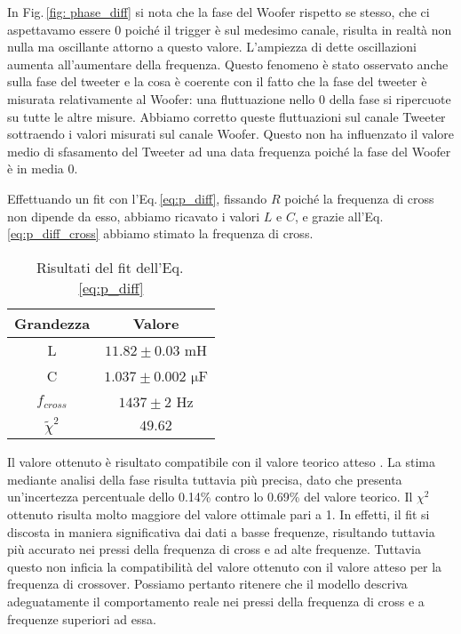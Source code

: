 \documentclass[../Relazione_circuiti]{subfiles}
\begin{document}
      In Fig.\,\ref{fig: phase_diff}
      si nota che la fase del Woofer rispetto se stesso, che ci aspettavamo essere 0 poiché il trigger è sul medesimo
      canale, risulta in realtà non nulla ma oscillante attorno a questo valore. L'ampiezza di dette oscillazioni
      aumenta all'aumentare della frequenza. Questo fenomeno è stato osservato anche sulla fase del tweeter e la cosa è
      coerente con il fatto che la fase del tweeter è misurata relativamente al Woofer: una fluttuazione nello 0 della
      fase si ripercuote su tutte le altre misure. Abbiamo corretto queste fluttuazioni sul canale Tweeter sottraendo i
      valori misurati sul canale Woofer. Questo non ha influenzato il valore medio di sfasamento del Tweeter ad una data
      frequenza poiché la fase del Woofer è in media 0.  
  
  
  Effettuando un fit con l'Eq.\,\eqref{eq:p_diff}, fissando $R$
      poiché la frequenza di cross non dipende da esso, abbiamo
      ricavato i valori $L$ e $C$, e grazie all'Eq.\,\eqref{eq:p_diff_cross} abbiamo stimato la frequenza di cross.



  \begin{table}[H]
    \centering

\begin{tabular}{c | c }
Grandezza & Valore  \\
\hline
L & $ 11.82 \pm 0.03 $  mH \\
C & $ 1.037 \pm 0.002 $  $\mathrm{\mu}$F \\
$f_{cross}$ & $ 1437 \pm 2$  Hz \\
$\widetilde{\chi}^2$ & $49.62$ 

    \end{tabular}
    \caption{Risultati del fit dell'Eq.\,\eqref{eq:p_diff}}
    \label{tab:fit_phase}

  \end{table}


Il valore ottenuto è risultato compatibile con il valore teorico atteso \theoryF. La stima mediante analisi della fase risulta tuttavia più precisa, dato che presenta un'incertezza percentuale dello 0.14\% contro lo 0.69\% del valore teorico. Il $\chi^2$ ottenuto risulta molto maggiore del valore ottimale pari a 1.
 In effetti, il fit si discosta in maniera significativa dai dati a basse frequenze, risultando tuttavia più accurato nei pressi della frequenza di cross e ad alte frequenze. Tuttavia questo non inficia la compatibilità del valore ottenuto con il valore atteso per la frequenza di crossover.
 Possiamo pertanto ritenere che il modello descriva adeguatamente il comportamento reale nei pressi della frequenza di cross e a frequenze superiori ad essa.
\end{document}
